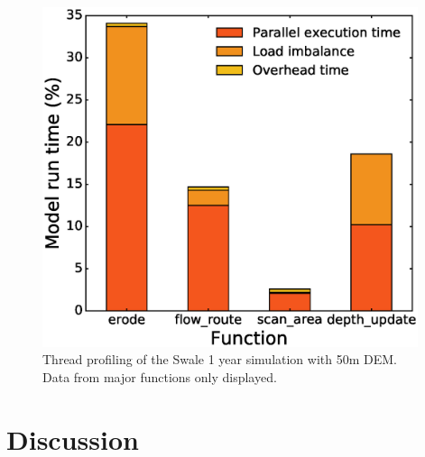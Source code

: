 \begin{figure}[t]
\includegraphics[width=11cm]{chp05_figures_scripts/fig_thread_profile.eps}
\caption{Thread profiling of the Swale 1 year simulation with 50m DEM. Data from major functions only displayed.}
\label{fig_thread_profile}
\end{figure}

%

\section{Discussion}



